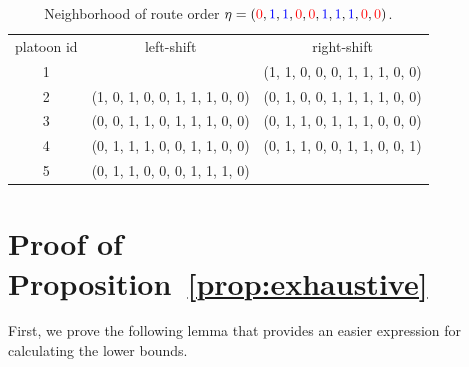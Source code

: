 \documentclass[a4paper]{article}
\theoremstyle{definition}
\theoremstyle{plain}
\newtheorem{proposition}{Proposition}
\begin{document}
\newcommand*{\1}{{\color{blue}1}}%
\newcommand*{\0}{{\color{red}0}}%

\begin{table}
\begin{center}
\begin{tabular}{c|c|c}
  platoon id  & left-shift & right-shift \\
  1 &  & (\1, \1, \0, \0, \0, \1, \1, \1, \0, \0) \\
  2 & (\1, \0, \1, \0, \0, \1, \1, \1, \0, \0) & (\0, \1, \0, \0, \1, \1, \1, \1, \0, \0) \\
  3 & (\0, \0, \1, \1, \0, \1, \1, \1, \0, \0) & (\0, \1, \1, \0, \1, \1, \1, \0, \0, \0) \\
  4 & (\0, \1, \1, \1, \0, \0, \1, \1, \0, \0) & (\0, \1, \1, \0, \0, \1, \1, \0, \0, \1) \\
  5 & (\0, \1, \1, \0, \0, \0, \1, \1, \1, \0) &
\end{tabular}
\end{center}
\caption{Neighborhood of route order $\eta = (\0, \1, \1, \0, \0, \1, \1, \1, \0, \0)$.}
\label{tab:local_search}
\end{table}












\newpage

\appendix

\section{Proof of Proposition~\ref{prop:exhaustive}}

First, we prove the following lemma that provides an easier expression for
calculating the lower bounds.
\end{document}
